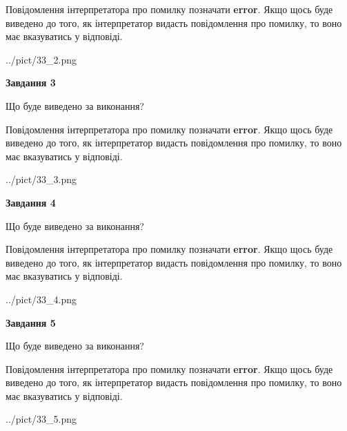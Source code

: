 \documentclass[12pt, ukrainian]{article}
\begin{document}
{\begin {large}
Повідомлення інтерпретатора про помилку позначати \textbf{error}.
Якщо щось буде виведено до того, як інтерпретатор видасть повідомлення про помилку, 
то воно має вказуватись у відповіді. \par


\begin{center}
	{../pict/33_2.png}
\end{center}
\newpage

{\begin {center}\textbf{Завдання 3}\end {center}}\par
Що буде виведено за виконання?

Повідомлення інтерпретатора про помилку позначати \textbf{error}.
Якщо щось буде виведено до того, як інтерпретатор видасть повідомлення про помилку, 
то воно має вказуватись у відповіді. \par


\begin{center}
	{../pict/33_3.png}
\end{center}
\newpage

{\begin {center}\textbf{Завдання 4}\end {center}}\par
Що буде виведено за виконання?

Повідомлення інтерпретатора про помилку позначати \textbf{error}.
Якщо щось буде виведено до того, як інтерпретатор видасть повідомлення про помилку, 
то воно має вказуватись у відповіді. \par


\begin{center}
	{../pict/33_4.png}
\end{center}
\newpage

{\begin {center}\textbf{Завдання 5}\end {center}}\par
Що буде виведено за виконання?

Повідомлення інтерпретатора про помилку позначати \textbf{error}.
Якщо щось буде виведено до того, як інтерпретатор видасть повідомлення про помилку, 
то воно має вказуватись у відповіді. \par


\begin{center}
	{../pict/33_5.png}
\end{center}
\newpage


\end{large}}
\end{document}
